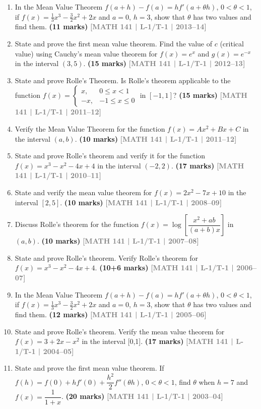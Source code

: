 \documentclass[12pt,a4paper]{article}
\newcommand{\yr}[1]{\hfill\textcolor{gray}{\small\textbf{[#1]}}}
\newcommand{\mk}[1]{\textcolor{orange!70!black}{\small\textbf{(#1 marks)}}}
\begin{document}
\begin{enumerate}
\item In the Mean Value Theorem $f(a+h)-f(a)=hf'(a+\theta h)$, $0<\theta<1$, if $f(x)=\tfrac{1}{3}x^{3}-\tfrac{3}{2}x^{2}+2x$ and $a=0$, $h=3$, show that $\theta$ has two values and find them.
\mk{11} \yr{MATH 141 | L-1/T-1 | 2013--14}

\item State and prove the first mean value theorem. Find the value of $c$ (critical value) using Cauchy's mean value theorem for $f(x)=e^{x}$ and $g(x)=e^{-x}$ in the interval $(3,5)$.
\mk{15} \yr{MATH 141 | L-1/T-1 | 2012--13}

\item State and prove Rolle's Theorem. Is Rolle's theorem applicable to the function
$f(x)=\begin{cases}x, & 0\le x<1\\ -x, & -1\leq x \leq0\end{cases}$
in $[-1,1]$?
\mk{15} \yr{MATH 141 | L-1/T-1 | 2011--12}

\item Verify the Mean Value Theorem for the function $f(x)=Ax^{2}+Bx+C$ in the interval $(a,b)$.
\mk{10} \yr{MATH 141 | L-1/T-1 | 2011--12}

\item State and prove Rolle's theorem and verify it for the function $f(x)=x^{3}-x^{2}-4x+4$ in the interval $(-2,2)$.
\mk{17} \yr{MATH 141 | L-1/T-1 | 2010--11}

\item State and verify the mean value theorem for $f(x)=2x^{2}-7x+10$ in the interval $[2,5]$.
\mk{10} \yr{MATH 141 | L-1/T-1 | 2008--09}

\item Discuss Rolle's theorem for the function $f(x)=\log\!\left[\dfrac{x^{2}+ab}{(a+b)x}\right]$ in $(a,b)$.
\mk{10} \yr{MATH 141 | L-1/T-1 | 2007--08}

\item State and prove Rolle's theorem. Verify Rolle's theorem for $f(x)=x^{3}-x^{2}-4x+4$.
\mk{10+6} \yr{MATH 141 | L-1/T-1 | 2006--07}

\item In the Mean Value Theorem $f(a+h)-f(a)=hf'(a+\theta h)$, $0<\theta<1$, if $f(x)=\tfrac{1}{3}x^{3}-\tfrac{3}{2}x^{2}+2x$ and $a=0$, $h=3$, show that $\theta$ has two values and find them.
\mk{12} \yr{MATH 141 | L-1/T-1 | 2005--06}

\item State and prove Rolle's theorem. Verify the mean value theorem for $f(x)=3+2x-x^{2}$ in the interval [0,1].
\mk{17} \yr{MATH 141 | L-1/T-1 | 2004--05}

\item State and prove the first mean value theorem. If $f(h)=f(0)+hf'(0)+\dfrac{h^{2}}{2}f''(\theta h)$, $0<\theta<1$, find $\theta$ when $h=7$ and $f(x)=\dfrac{1}{1+x}$.
\mk{20} \yr{MATH 141 | L-1/T-1 | 2003--04}

\end{enumerate}
\end{document}
